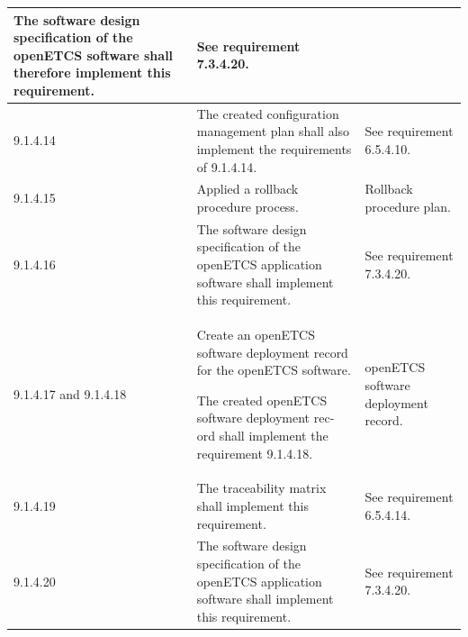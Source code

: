 \documentclass{template/openetcs_report}
\begin{document}
{\begin{longtable}{|p{2cm}|p{9cm}|p{3cm}|}
The software design specification of the openETCS software shall therefore implement this requirement.
& See requirement 7.3.4.20.\\ 
\hline
9.1.4.14 & The created configuration management plan shall also implement the requirements of 9.1.4.14.
& See requirement 6.5.4.10.\\ 
\hline
9.1.4.15 & Applied a rollback procedure process.
& Rollback procedure plan.\\ 
\hline
9.1.4.16 & The software design specification of the openETCS application software shall implement this requirement.
& See requirement 7.3.4.20.\\ 
\hline
9.1.4.17 and 9.1.4.18 & Create an openETCS software deployment record for the openETCS software.

The created openETCS software deployment rec-ord shall implement the requirement 9.1.4.18.
& openETCS software deployment record.\\ 
\hline
9.1.4.19 & The traceability matrix shall implement this requirement.
& See requirement 6.5.4.14.\\ 
\hline
9.1.4.20 & The software design specification of the openETCS application software shall implement this requirement.
& See requirement 7.3.4.20.\\ 
\hline
\end{longtable}}
\end{document}
